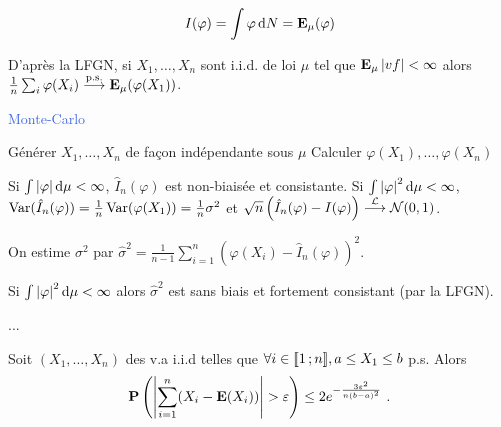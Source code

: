 $$I(\varphi) = \int \varphi \mathop{}\mathopen{}\mathrm{d} N = \mathbf{E}_\mu(\varphi)$$

D'après la LFGN, si $X_1,\ldots,X_n$ sont i.i.d. de loi $\mu$ tel que $\mathbf{E}_\mu \left\lvert vf\right\rvert < \infty$ alors $\frac{1}{n} \sum_i \varphi(X_i) \overset{\text{p.s.}}{\longrightarrow} \mathbf{E}_\mu (\varphi(X_1))$.

\begin{algorithm}[h]
\caption{\textcolor{RoyalBlue}{Monte-Carlo}}
	Générer $X_1,\ldots,X_n$ de façon indépendante sous $\mu$ \;
	Calculer $\varphi(X_1),\ldots,\varphi(X_n)$ \;
\end{algorithm}

\begin{pop}
	Si $\int \left\lvert\varphi\right\rvert \mathop{}\mathopen{}\mathrm{d} \mu < \infty$, $\hat{I}_n(\varphi)$ est non-biaisée et consistante.
	Si $\int \left\lvert\varphi\right\rvert^2 \mathop{}\mathopen{}\mathrm{d} \mu < \infty$, $\operatorname{Var}(\hat{I}_n(\varphi)) = \frac{1}{n} \operatorname{Var}(\varphi(X_1)) = \frac{1}{n} \sigma^2$ et $\sqrt{n} \left( \hat{I}_n(\varphi) - I(\varphi) \right) \overset{\mathcal{L}}{\longrightarrow} \mathcal{N}(0,1)$.
\end{pop}

On estime $\sigma^2$ par $\hat{\sigma}^2 = \frac{1}{n - 1} \sum_{i = 1}^n \left( \varphi(X_i) - \hat{I}_n(\varphi) \right)^2$.

\begin{pop}
	Si $\int \left\lvert\varphi\right\rvert^2 \mathop{}\mathopen{}\mathrm{d} \mu < \infty$ alors $\hat \sigma^2$ est sans biais et fortement consistant (par la LFGN).
\end{pop}

...

\begin{thm}
	Soit $(X_1,\ldots,X_n)$ des v.a i.i.d telles que $\forall i \in \mathopen{[\![}1\mathclose{}\mathpunct{};n\mathclose{]\!]}, a \leq X_1 \leq b$ p.s.
	Alors
	$$\mathbf{P} \left( \left\lvert\sum_{i = 1}^n (X_i - \mathbf{E}(X_i)) \right\rvert > \varepsilon \right) \leq 2 e^{- \frac{3 \varepsilon^2}{n(b - a)^2}}\ .$$
\end{thm}

